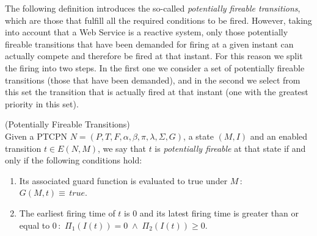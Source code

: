 The following definition introduces the so-called {\em potentially
fireable transitions}, which are those that fulfill all the
required conditions to be fired. However, taking into account
that a Web Service is a reactive system, only those potentially
fireable transitions that have been demanded for firing at a given
instant can actually compete and therefore be fired at that instant.
For this reason we split the firing into two steps.
In the first one we consider a set of potentially fireable
transitions (those that have been demanded), and
in the second we select from this set the transition
that is actually fired at that instant (one with the greatest
priority in this set).

\begin{definition}(Potentially Fireable Transitions)\\
Given a PTCPN $N=(P,T,F,\alpha,\beta,\pi,\lambda,\Sigma, G)$, a
state $(M,I)$ and an enabled transition $t\in E(N,M)$, we say that
$t$ is {\it potentially fireable} at that state if and only if the
following conditions hold:
\begin{enumerate}
\item Its associated guard function  is evaluated to true under $M\,$:
$G(M,t)\equiv\, true.$
\item\label{condtemp} The earliest firing time of $t$ is 0
and its latest firing time is greater than or equal to 0\,:
\,$\Pi_1(I(t))=0\; \wedge \; \Pi_2(I(t)) \geq 0$.
\end{enumerate}
\end{definition}

